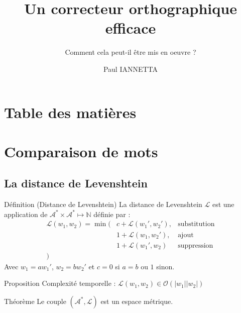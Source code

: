 \documentclass[gray,slidestop,compress,mathserif,smaller,fleqn]{beamer}
\title{Un correcteur orthographique efficace}
\subtitle{Comment cela peut-il \^etre mis en oeuvre ?}
\author{Paul IANNETTA}
\institute{}
\date{}
\begin{document}
\frame{\titlepage}

\section*{Table des matières}
\frame{\tableofcontents}

\section{Comparaison de mots}
\subsection{La distance de Levenshtein}
\begin{frame}
  \begin{block}{Définition (Distance de Levenshtein)}
    La \alert{distance de Levenshtein} $ \mathcal{L} $ est une application de $ \mathcal{A^*} \times \mathcal{A^*} \longmapsto \mathbb{N} $ définie par :
    \begin{eqnarray*}
     \mathcal{L}(w_1, w_2) = \min(&c + \mathcal{L}(w_1', w_2'), & \text{substitution} \\
                                  &1 + \mathcal{L}(w_1, w_2'),  & \text{ajout} \\
                                  &1 + \mathcal{L}(w_1', w_2)   & \text{suppression} \\
                           )      &                             &
    \end{eqnarray*}
    Avec $ w_1 = aw_1' $, $ w_2 = bw_2' $ et $c = 0$ si $a = b$ ou $ 1 $ sinon.
  \end{block}
  
  \begin{block}{Proposition}
    Complexité temporelle : 
    $ \mathcal{L}(w_1, w_2) \in \mathcal{O}(|w_1||w_2|) $
  \end{block}
  
  \begin{block}{Théorème}
    Le couple $(\mathcal{A}^*, \mathcal{L})$ est un espace métrique.
  \end{block}
\end{frame}
\end{document}
